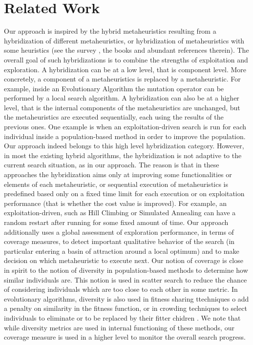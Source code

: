 \section{Related Work}
Our approach is inspired by the hybrid metaheuristics resulting from a hybridization of different metaheuristics, or hybridization of metaheuristics with some heuristics (see the survey \cite{Talbi2009}, the books \cite{Lones2011,Talbi2013} and abundant references therein). The overall goal of such hybridizations is to combine the strengths of exploitation and exploration. A hybridization can be at a low level, that is component level. More concretely, a component of a metaheuristics is replaced by a metaheuristic. For example, inside an Evolutionary Algorithm the mutation operator can be performed by a local search algorithm. A hybridization can also be at a higher level, that is the internal components of the metaheuristics are unchanged, but the metaheuristics are executed sequentially, each using the results of the previous ones. One example is when an exploitation-driven search is run for each individual inside a population-based method in order to improve the population. Our approach indeed belongs to this high level hybridization category. However, in most the existing hybrid algorithms, the hybridization is not adaptive to the current search situation, as in our approach. The reason is that in these approaches the hybridization aims only at improving some functionalities or elements of each metaheuristic, or sequential execution of metaheuristics is predefined based only on a fixed time limit for each execution or on exploitation performance (that is whether the cost value is improved). For example, an exploitation-driven, such as Hill Climbing or Simulated Annealing can have a random restart after running for some fixed amount of time. Our approach additionally uses a global assessment of exploration performance, in terms of coverage measures, to detect important qualitative behavior of the search (in particular entering a basin of attraction around a local optimum) and to make decision on which metaheuristic to execute next. Our notion of coverage is close in spirit to the notion of diversity in population-based methods to determine how similar individuals are. This notion is used in scatter search \cite{Glover2011} to reduce the chance of considering individuals which are too close to each other in some metric. In evolutionary algorithms, diversity is also used in fitness sharing ttechniques o add a penalty on similarity in the fitness function, or in crowding techniques to select individuals to eliminate or to be replaced by their fitter chidren \cite{WongWMPZ2012}. We note that while diversity metrics are used in internal functioning of these methods, our coverage measure is used in a higher level to monitor the overall search progress.
